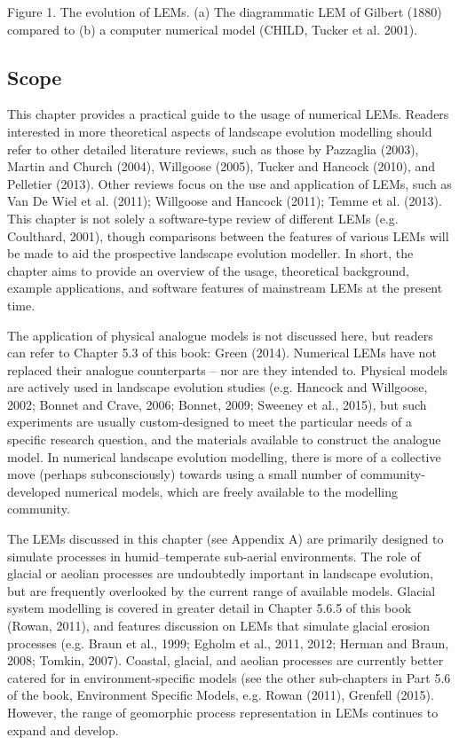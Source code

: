Figure 1. The evolution of LEMs. (a) The diagrammatic LEM of Gilbert (1880) compared to (b) a computer numerical model (CHILD, Tucker et al. 2001). 

\subsection[Scope]{Scope}
This chapter provides a practical guide to the usage of numerical LEMs. Readers interested in more theoretical aspects of landscape evolution modelling should refer to other detailed literature reviews, such as those by Pazzaglia (2003), Martin and Church (2004), Willgoose (2005), Tucker and Hancock (2010), and Pelletier (2013). Other reviews focus on the use and application of LEMs, such as Van De Wiel et al. (2011); Willgoose and Hancock (2011); Temme et al. (2013). This chapter is not solely a software-type review of different LEMs (e.g. Coulthard, 2001), though comparisons between the features of various LEMs will be made to aid the prospective landscape evolution modeller. In short, the chapter aims to provide an overview of the usage, theoretical background, example applications, and software features of mainstream LEMs at the present time.

The application of physical analogue models is not discussed here, but readers can refer to Chapter 5.3 of this book: Green (2014). Numerical LEMs have not replaced their analogue counterparts – nor are they intended to. Physical models are actively used in landscape evolution studies (e.g. Hancock and Willgoose, 2002; Bonnet and Crave, 2006; Bonnet, 2009; Sweeney et al., 2015), but such experiments are usually custom-designed to meet the particular needs of a specific research question, and the materials available to construct the analogue model. In numerical landscape evolution modelling, there is more of a collective move (perhaps subconsciously) towards using a small number of community-developed numerical models, which are freely available to the modelling community.

The LEMs discussed in this chapter (see Appendix A) are primarily designed to simulate processes in humid–temperate sub-aerial environments. The role of glacial or aeolian processes are undoubtedly important in landscape evolution, but are frequently overlooked by the current range of available models. Glacial system modelling is covered in greater detail in Chapter 5.6.5 of this book (Rowan, 2011), and features discussion on LEMs that simulate glacial erosion processes (e.g. Braun et al., 1999; Egholm et al., 2011, 2012; Herman and Braun, 2008; Tomkin, 2007). Coastal, glacial, and aeolian processes are currently better catered for in environment-specific models (see the other sub-chapters in Part 5.6 of the book, Environment Specific Models, e.g. Rowan (2011), Grenfell (2015). However, the range of geomorphic process representation in LEMs continues to expand and develop.

